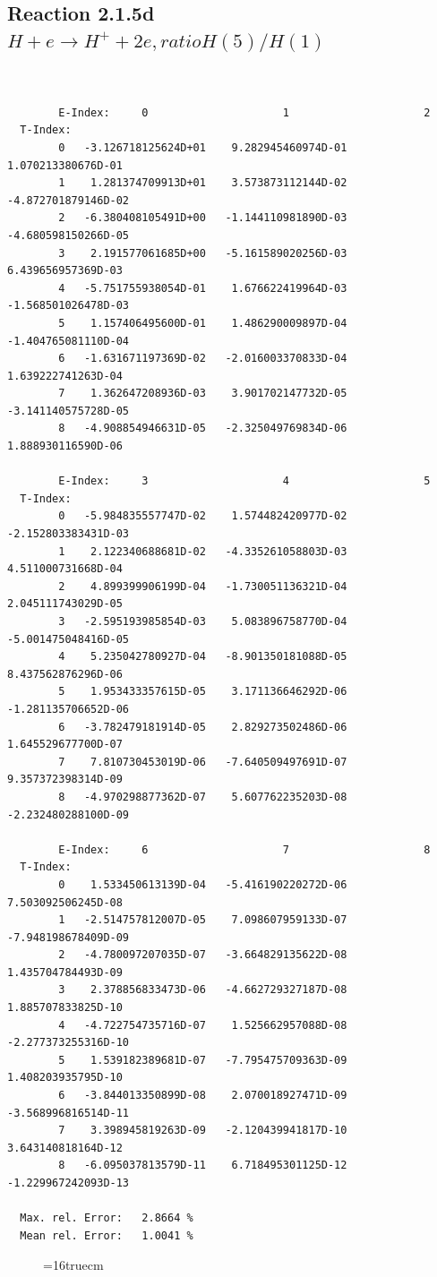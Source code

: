 \documentclass[12pt,dvips]{article}
\begin{document}
\newpage
\subsection{
Reaction 2.1.5d  $H + e \rightarrow H^+ + 2e, ratio H(5)/H(1)$
}


\begin{small}\begin{verbatim}


        E-Index:     0                     1                     2
  T-Index:
        0   -3.126718125624D+01    9.282945460974D-01    1.070213380676D-01
        1    1.281374709913D+01    3.573873112144D-02   -4.872701879146D-02
        2   -6.380408105491D+00   -1.144110981890D-03   -4.680598150266D-05
        3    2.191577061685D+00   -5.161589020256D-03    6.439656957369D-03
        4   -5.751755938054D-01    1.676622419964D-03   -1.568501026478D-03
        5    1.157406495600D-01    1.486290009897D-04   -1.404765081110D-04
        6   -1.631671197369D-02   -2.016003370833D-04    1.639222741263D-04
        7    1.362647208936D-03    3.901702147732D-05   -3.141140575728D-05
        8   -4.908854946631D-05   -2.325049769834D-06    1.888930116590D-06

        E-Index:     3                     4                     5
  T-Index:
        0   -5.984835557747D-02    1.574482420977D-02   -2.152803383431D-03
        1    2.122340688681D-02   -4.335261058803D-03    4.511000731668D-04
        2    4.899399906199D-04   -1.730051136321D-04    2.045111743029D-05
        3   -2.595193985854D-03    5.083896758770D-04   -5.001475048416D-05
        4    5.235042780927D-04   -8.901350181088D-05    8.437562876296D-06
        5    1.953433357615D-05    3.171136646292D-06   -1.281135706652D-06
        6   -3.782479181914D-05    2.829273502486D-06    1.645529677700D-07
        7    7.810730453019D-06   -7.640509497691D-07    9.357372398314D-09
        8   -4.970298877362D-07    5.607762235203D-08   -2.232480288100D-09

        E-Index:     6                     7                     8
  T-Index:
        0    1.533450613139D-04   -5.416190220272D-06    7.503092506245D-08
        1   -2.514757812007D-05    7.098607959133D-07   -7.948198678409D-09
        2   -4.780097207035D-07   -3.664829135622D-08    1.435704784493D-09
        3    2.378856833473D-06   -4.662729327187D-08    1.885707833825D-10
        4   -4.722754735716D-07    1.525662957088D-08   -2.277373255316D-10
        5    1.539182389681D-07   -7.795475709363D-09    1.408203935795D-10
        6   -3.844013350899D-08    2.070018927471D-09   -3.568996816514D-11
        7    3.398945819263D-09   -2.120439941817D-10    3.643140818164D-12
        8   -6.095037813579D-11    6.718495301125D-12   -1.229967242093D-13

  Max. rel. Error:   2.8664 %
  Mean rel. Error:   1.0041 %

\end{verbatim}\end{small}
\begin{figure} \label{2.1.5d}
\epsfxsize=16truecm
\end{figure}
\end{document}
